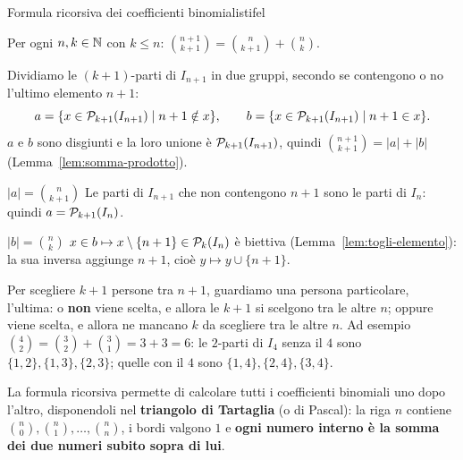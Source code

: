 \begin{concetto}
\begin{Teorema}{Formula ricorsiva dei coefficienti binomiali}{stifel}
    \begin{prerequisiti}
    \end{prerequisiti}
    Per ogni $n, k \in \mathbb{N}$ con $k \leq n$: \quad $\displaystyle\binom{n + 1}{k + 1} = \binom{n}{k + 1} + \binom{n}{k}$.
\end{Teorema}
\begin{dimostrazione}
    Dividiamo le $(k + 1)$-parti di $I_{n + 1}$ in due gruppi, secondo se contengono o no l'ultimo elemento $n + 1$:
    \[ a = \{x \in \mathcal{P}_{k + 1}(I_{n + 1}) \mid n + 1 \notin x\}, \qquad b = \{x \in \mathcal{P}_{k + 1}(I_{n + 1}) \mid n + 1 \in x\}. \]
    $a$ e $b$ sono disgiunti e la loro unione è $\mathcal{P}_{k + 1}(I_{n + 1})$, quindi $\binom{n + 1}{k + 1} = |a| + |b|$ (Lemma~\ref{lem:somma-prodotto}).
    \begin{caso}{$|a| = \binom{n}{k + 1}$}
        Le parti di $I_{n + 1}$ che non contengono $n + 1$ sono le parti di $I_n$: quindi $a = \mathcal{P}_{k + 1}(I_n)$.
    \end{caso}
    \begin{caso}{$|b| = \binom{n}{k}$}
        $x \in b \mapsto x \setminus \{n + 1\} \in \mathcal{P}_k(I_n)$ è biettiva (Lemma~\ref{lem:togli-elemento}): la sua inversa aggiunge $n + 1$, cioè
        $y \mapsto y \cup \{n + 1\}$.
    \end{caso}
\end{dimostrazione}
\end{concetto}

\begin{spiegazione}
    Per scegliere $k + 1$ persone tra $n + 1$, guardiamo una persona particolare, l'ultima: o \textbf{non} viene scelta, e allora le
    $k + 1$ si scelgono tra le altre $n$; oppure viene scelta, e allora ne mancano $k$ da scegliere tra le altre $n$. Ad esempio
    $\binom{4}{2} = \binom{3}{2} + \binom{3}{1} = 3 + 3 = 6$: le $2$-parti di $I_4$ senza il $4$ sono $\{1,2\}, \{1,3\}, \{2,3\}$; quelle con il $4$ sono
    $\{1,4\}, \{2,4\}, \{3,4\}$.
\end{spiegazione}

La formula ricorsiva permette di calcolare tutti i coefficienti binomiali uno dopo l'altro, disponendoli nel
\textbf{triangolo di Tartaglia} (o di Pascal): la riga $n$ contiene $\binom{n}{0}, \binom{n}{1}, \dots, \binom{n}{n}$, i bordi valgono $1$ e
\textbf{ogni numero interno è la somma dei due numeri subito sopra di lui}.


